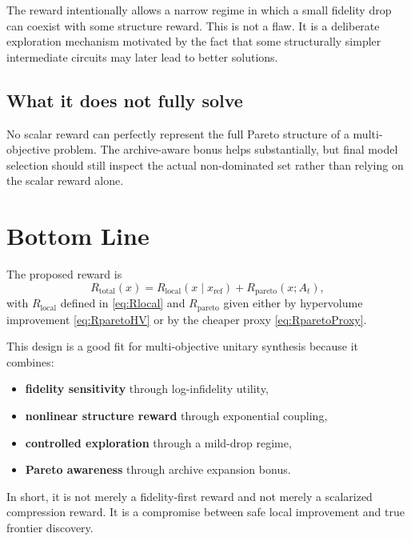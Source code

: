 \documentclass[11pt]{article}
\begin{document}
The reward intentionally allows a narrow regime in which a small fidelity drop can coexist with some structure reward. This is not a flaw. It is a deliberate exploration mechanism motivated by the fact that some structurally simpler intermediate circuits may later lead to better solutions.

\subsection{What it does not fully solve}

No scalar reward can perfectly represent the full Pareto structure of a multi-objective problem. The archive-aware bonus helps substantially, but final model selection should still inspect the actual non-dominated set rather than relying on the scalar reward alone.

\section{Bottom Line}

The proposed reward is
\begin{equation*}
    R_{\mathrm{total}}(x)
    =
    R_{\mathrm{local}}(x\mid x_{\mathrm{ref}})
    +
    R_{\mathrm{pareto}}(x;A_t),
\end{equation*}
with $R_{\mathrm{local}}$ defined in \eqref{eq:Rlocal} and $R_{\mathrm{pareto}}$ given either by hypervolume improvement \eqref{eq:RparetoHV} or by the cheaper proxy \eqref{eq:RparetoProxy}.

This design is a good fit for multi-objective unitary synthesis because it combines:
\begin{itemize}
    \item \textbf{fidelity sensitivity} through log-infidelity utility,
    \item \textbf{nonlinear structure reward} through exponential coupling,
    \item \textbf{controlled exploration} through a mild-drop regime,
    \item \textbf{Pareto awareness} through archive expansion bonus.
\end{itemize}

In short, it is not merely a fidelity-first reward and not merely a scalarized compression reward. It is a compromise between safe local improvement and true frontier discovery.
\end{document}
